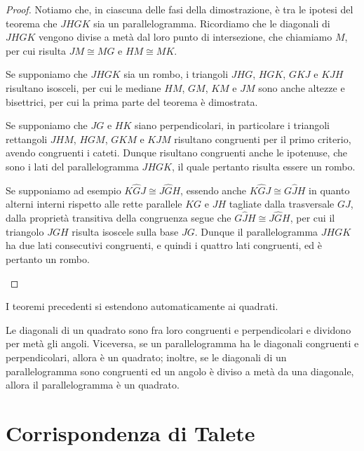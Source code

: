 \begin{proof}
Notiamo che, in ciascuna delle fasi della dimostrazione, è tra le 
ipotesi del teorema che \(JHGK\) sia un parallelogramma. Ricordiamo che 
le diagonali di \(JHGK\) vengono divise a metà dal loro punto di 
intersezione, che chiamiamo \(M\), per cui risulta \(JM\cong MG\) e 
\(HM\cong MK\).
\begin{enumeratea}
\item Se supponiamo che \(JHGK\) sia un rombo, i triangoli \(JHG\), 
\(HGK\), \(GKJ\) e \(KJH\) risultano isosceli, per cui le mediane \(HM\), 
\(GM\), \(KM\) e \(JM\) sono anche altezze e bisettrici, per cui la prima 
parte del teorema è dimostrata.
\item Se supponiamo che \(JG\) e \(HK\) siano perpendicolari, in 
particolare i triangoli rettangoli \(JHM\), \(HGM\), \(GKM\) e \(KJM\) 
risultano congruenti per il primo criterio, avendo congruenti i 
cateti. Dunque risultano congruenti anche le ipotenuse, che sono i 
lati del parallelogramma \(JHGK\), il quale pertanto risulta essere un 
rombo.
\item Se supponiamo ad esempio \(K\widehat{G}J\cong J\widehat{G}H\), 
essendo anche \(K\widehat{G}J\cong G\widehat{J}H\) in quanto alterni 
interni rispetto alle rette parallele \(KG\) e \(JH\) tagliate dalla 
trasversale \(GJ\), dalla proprietà transitiva della congruenza segue 
che \(G\widehat{J}H\cong J\widehat{G}H\), per cui il triangolo \(JGH\) 
risulta isoscele sulla base \(JG\). Dunque il parallelogramma \(JHGK\) ha 
due lati consecutivi congruenti, e quindi i quattro lati congruenti, 
ed è pertanto un rombo.
\end{enumeratea}
\end{proof}

I teoremi precedenti si estendono automaticamente ai quadrati.
\begin{corollario}
Le diagonali di un quadrato sono fra loro congruenti e perpendicolari 
e dividono per metà gli angoli. Viceversa, se un parallelogramma ha 
le diagonali congruenti e perpendicolari, allora è un quadrato; 
inoltre, se le diagonali di un parallelogramma sono congruenti ed un 
angolo è diviso a metà da una diagonale, allora il parallelogramma è 
un quadrato.
\end{corollario}

\section{Corrispondenza di Talete}\label{sect:corrispondenza_talete}

